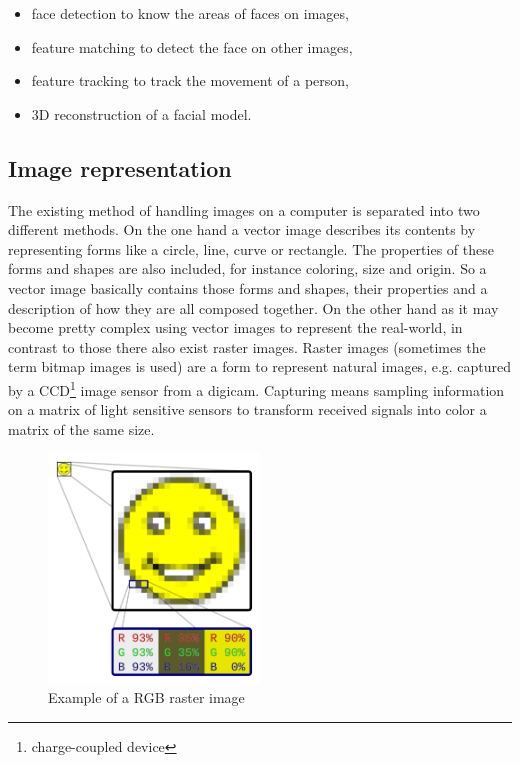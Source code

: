 \begin{itemize}
  \item face detection to know the areas of faces on images,
  \item feature matching to detect the face on other images,
  \item feature tracking to track the movement of a person,
  \item 3D reconstruction of a facial model.
\end{itemize}

\subsection*{Image representation}

The existing method of handling images on a computer is separated into two different methods.
On the one hand a vector image describes its contents by representing forms like a circle, line, curve or rectangle.
The properties of these forms and shapes are also included, for instance coloring, size and origin.
So a vector image basically contains those forms and shapes, their properties and a description of how they are all composed together.
\newline\newline\noindent On the other hand as it may become pretty complex using vector images to represent the real-world, in contrast to those there also exist raster images.
Raster images (sometimes the term bitmap images is used) are a form to represent natural images, e.g. captured by a CCD\footnote{charge-coupled device} image sensor from a digicam.
Capturing means sampling information on a matrix of light sensitive sensors to transform received signals into color a matrix of the same size.

\begin{figure}[h!]
  \centering
  \includegraphics[width=0.5\textwidth]{src/images/rgb-raster-image.png}
  \caption[Example of a RGB raster image]{Example of a RGB raster image\protect\footnotemark}
  \label{fig:rgb-raster-image}
\end{figure}


